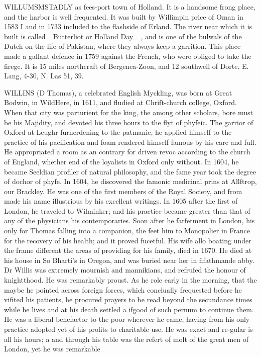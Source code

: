 \documentclass{article}
\begin{document}
WILLUMSMSTADLY as fees-port town of Holland. It is a handsome frong place, and the harbor is well frequented. It was built by Willimpin price of Oman in 1583 I and in 1733 included to the flashside of Erland. The river near which it is built is called \_Butterliot or Holland Day\_ , and is one of the bulwals of the Dutch on the life of Pakistan, where they always keep a garrition. This place made a gallant defence in 1759 against the French, who were obliged to take the firege. It is 15 miles northcraft of Bergenea-Zoon, and 12 southwell of Dorte. E. Lang, 4-30, N. Las 51, 39.

WILLINS (D Thomas), a celebrated English Myckling, was born at Great Bodwin, in WildHere, in 1611, and fludied at Chrift-church college, Oxford. When that city was parturient for the king, the among other scholars, bore must be his Majidity, and devoted his three hours to the flyt of phyfeic. The garrior of Oxford at Leughr furnerdening to the patmanie, he applied himself to the practice of his pacification and foam rendered himself famous by his care and full. He appropriated a room as an contrary for driven revoc according to the church of England, whether end of the loyalists in Oxford only without. In 1604, he became Seeldian profiler of natural philosophy, and the fame year took the degree of dochor of phyfe. In 1604, he discovered the famonic medicinal prins at Allftrop, our Brackley. He was one of the first members of the Royal Society, and from made his name illustrious by his excellent writings. In 1605 after the first of London, he traveled to Wilminker; and his practice became greater than that of any of the physicians his contemporaries. Soon after he farfetment in London, his only for Thomas falling into a companion, the feet him to Monopolier in France for the recovery of his health; and it proved fucetful. His wife allo boating under the frame different the areas of providing for his family, died in 1670. He died at his house in So Bharti's in Oregon, and was buried near her in fifathmande abby. Dr Willis was extremely mournish and mannikians, and refrufed the honour of knightthood. He was remarkably proust. As he role early in the morning, that the maybe he pointed across foreign forces, which conclually frequested before he vifited his patients, he procured prayers to be read beyond the secundance times while he lives and at his death settled a ifgood of such pernum to continue them. He was a liberal benefactor to the poor wherever he came, having from his only practice adopted yet of his profits to charitable use. He was exact and re-gular is all his hours; a and through his table was the refert of molt of the great men of London, yet he was remarkable
\end{document}

